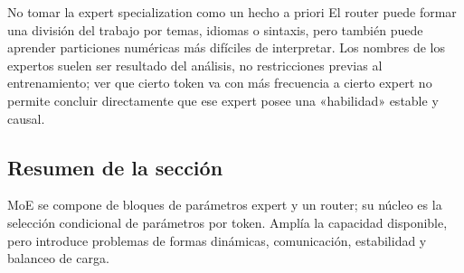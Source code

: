 \begin{warningbox}{No tomar la expert specialization como un hecho a priori}
El router puede formar una división del trabajo por temas, idiomas o sintaxis, pero también puede aprender particiones numéricas más difíciles de interpretar. Los nombres de los expertos suelen ser resultado del análisis, no restricciones previas al entrenamiento; ver que cierto token va con más frecuencia a cierto expert no permite concluir directamente que ese expert posee una «habilidad» estable y causal.
\end{warningbox}

\subsection{Resumen de la sección}

MoE se compone de bloques de parámetros expert y un router; su núcleo es la selección condicional de parámetros por token. Amplía la capacidad disponible, pero introduce problemas de formas dinámicas, comunicación, estabilidad y balanceo de carga.
